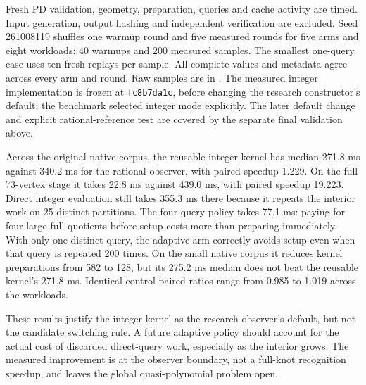 

Fresh PD validation, geometry, preparation, queries and cache activity are
timed. Input generation, output hashing and independent verification are
excluded. Seed 261008119 shuffles one warmup round and five measured rounds
for five arms and eight workloads: 40 warmups and 200 measured samples. The
smallest one-query case uses ten fresh replays per sample. All complete values
and metadata agree across every arm and round. Raw samples are in
.
The measured integer implementation is frozen at \texttt{fc8b7da1c}, before
changing the research constructor's default; the benchmark selected integer
mode explicitly. The later default change and explicit rational-reference
test are covered by the separate final validation above.

Across the original native corpus, the reusable integer kernel has median
271.8 ms against 340.2 ms for the rational observer, with paired speedup 1.229.
On the full 73-vertex stage it takes 22.8 ms against 439.0 ms, with paired
speedup 19.223. Direct integer evaluation still takes 355.3 ms there because
it repeats the interior work on 25 distinct partitions. The four-query policy
takes 77.1 ms: paying for four large full quotients before setup costs more
than preparing immediately. With only one distinct query, the adaptive arm
correctly avoids setup even when that query is repeated 200 times. On the
small native corpus it reduces kernel preparations from 582 to 128, but its
275.2 ms median does not beat the reusable kernel's 271.8 ms. Identical-control
paired ratios range from 0.985 to 1.019 across the workloads.

These results justify the integer kernel as the research observer's default,
but not the candidate switching rule. A future adaptive policy should account
for the actual cost of discarded direct-query work, especially as the interior
grows. The measured improvement is at the observer boundary, not a full-knot
recognition speedup, and leaves the global quasi-polynomial problem open.
